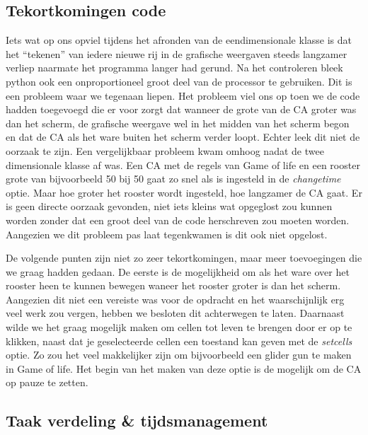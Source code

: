 \documentclass{article}
\begin{document}
\subsection{Tekortkomingen code}
Iets wat op ons opviel tijdens het afronden van de eendimensionale klasse is dat het “tekenen” van iedere nieuwe rij in de grafische weergaven steeds langzamer verliep naarmate het programma langer had gerund. Na het controleren bleek python ook een onproportioneel groot deel van de processor te gebruiken. Dit is een probleem waar we tegenaan liepen. Het probleem viel ons op toen we de code hadden toegevoegd die er voor zorgt dat wanneer de grote van de CA groter was dan het scherm, de grafische weergave wel in het midden van het scherm begon en dat de CA als het ware buiten het scherm verder loopt. Echter leek dit niet de oorzaak te zijn. \newline
Een vergelijkbaar probleem kwam omhoog nadat de twee dimensionale klasse af was. Een CA met de regels van Game of life en een rooster grote van bijvoorbeeld 50 bij 50 gaat zo snel als is ingesteld in de \emph{changetime} optie. Maar hoe groter het rooster wordt ingesteld, hoe langzamer de CA gaat. Er is geen directe oorzaak gevonden, niet iets kleins wat opgeglost zou kunnen worden zonder dat een groot deel van de code herschreven zou moeten worden. Aangezien we dit probleem pas laat tegenkwamen is dit ook niet opgelost.

De volgende punten zijn niet zo zeer tekortkomingen, maar meer toevoegingen die we graag hadden gedaan. \newline
De eerste is de mogelijkheid om als het ware over het rooster heen te kunnen bewegen waneer het rooster groter is dan het scherm. Aangezien dit niet een vereiste was voor de opdracht en het waarschijnlijk erg veel werk zou vergen, hebben we besloten dit achterwegen te laten.\newline
Daarnaast wilde we het graag mogelijk maken om cellen tot leven te brengen door er op te klikken, naast dat je geselecteerde cellen een toestand kan geven met de \emph{setcells} optie. Zo zou het veel makkelijker zijn om bijvoorbeeld een glider gun te maken in Game of life. Het begin van het maken van deze optie is de mogelijk om de CA op pauze te zetten.

\subsection{Taak verdeling \& tijdsmanagement}
\end{document}
